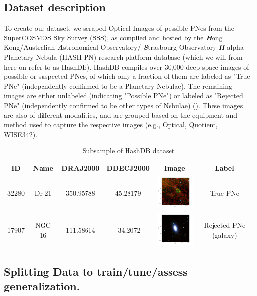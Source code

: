\documentclass{article}
\begin{document}
\subsection{Dataset description}
To create our dataset, we scraped Optical Images of possible PNes from the SuperCOSMOS Sky Survey (SSS), as compiled and hosted by the \textbf{\textit{H}}ong Kong/Australian \textbf{\textit{A}}stronomical Observatory/ \textbf{\textit{S}}trasbourg Observatory \textbf{\textit{H}}-alpha Planetary Nebula (HASH-PN) research platform database (which we will from here on refer to as HashDB). HashDB compiles over 30,000 deep-space images of possible or suspected PNes, of which only a fraction of them are labeled as "True PNe" (independently confirmed to be a Planetary Nebulae). The remaining images are either unlabeled (indicating "Possible PNe") or labeled as "Rejected PNe" (independently confirmed to be other types of Nebulae) (\cite{parker2016hash}). These images are also of different modalities, and are grouped based on the equipment and method used to capture the respective images (e.g., Optical, Quotient, WISE342).

\begin{table}[h!]
\centering
\begin{tabular}{|c|c|c|c|c|c|}
\hline
\textbf{ID} & \textbf{Name} & \textbf{DRAJ2000} & \textbf{DDECJ2000} & \textbf{Image} & \textbf{Label} \\ \hline
32280 & Dr 21 & 350.95788 & 45.28179 & \includegraphics[width=1in]{32280_wise432_rgb.png} & True PNe \\ \hline
17907 & NGC 16 & 111.58614 & -34.2072 & \includegraphics[width=1in]{17907_sss_irb2.png} & Rejected PNe (galaxy) \\ \hline
\end{tabular}
\caption{Subsample of HashDB dataset}
\end{table}

\subsection{Splitting Data to train/tune/assess generalization.}
\end{document}
